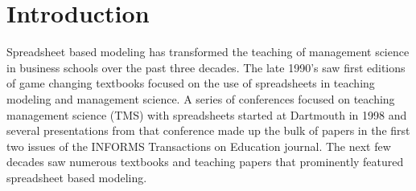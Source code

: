 \documentclass[ited,blindrev]{informs3}              %
\begin{document}
%


\section{Introduction}

Spreadsheet based modeling has transformed the teaching of management science in business schools over the past three decades. The late 1990's saw first editions of game changing textbooks \cite{winstonPracticalManagementScience2018,ragsdaleSpreadsheetModelingDecision2017} focused on the use of spreadsheets in teaching modeling and management science.  A series of conferences focused on teaching management science (TMS) with spreadsheets started at Dartmouth in 1998 and several presentations from that conference made up the bulk of papers in the first two issues of the INFORMS Transactions on Education journal. The next few decades saw numerous textbooks \cite{BusinessAnalyticsArt, BusinessAnalytics4th} and teaching papers \cite{INFORMSTransactionsEducation2014} that prominently featured spreadsheet based modeling.
\end{document}

